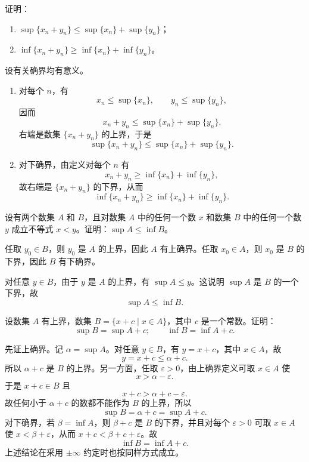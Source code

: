 \begin{xexercise}[5]
证明：
  \begin{enumerate}[label=(\arabic*)]
    \item $\sup\{x_n+y_n\}\leqslant\sup\{x_n\}+\sup\{y_n\}$；
    \item $\inf\{x_n+y_n\}\geqslant\inf\{x_n\}+\inf\{y_n\}$。
  \end{enumerate}
\end{xexercise}
\begin{xsolution}
设有关确界均有意义。
\begin{enumerate}[label=(\arabic*)]
  \item 对每个 $n$，有
  \[
    x_n\leqslant\sup\{x_n\},\qquad
    y_n\leqslant\sup\{y_n\},
  \]
  因而
  \[
    x_n+y_n\leqslant\sup\{x_n\}+\sup\{y_n\}.
  \]
  右端是数集 $\{x_n+y_n\}$ 的上界，于是
  \[
    \sup\{x_n+y_n\}\leqslant\sup\{x_n\}+\sup\{y_n\}.
  \]

  \item 对下确界，由定义对每个 $n$ 有
  \[
    x_n+y_n\geqslant\inf\{x_n\}+\inf\{y_n\},
  \]
  故右端是 $\{x_n+y_n\}$ 的下界，从而
  \[
    \inf\{x_n+y_n\}\geqslant\inf\{x_n\}+\inf\{y_n\}.
  \]
\end{enumerate}
\end{xsolution}


\begin{xexercise}[6]
设有两个数集 $A$ 和 $B$，且对数集 $A$ 中的任何一个数 $x$ 和数集 $B$ 中的任何一个数 $y$ 成立不等式 $x<y$。证明：$\sup A\leqslant\inf B$。
\end{xexercise}
\begin{xsolution}
任取 $y_0\in B$，则 $y_0$ 是 $A$ 的上界，因此 $A$ 有上确界。任取 $x_0\in A$，则 $x_0$ 是 $B$ 的下界，因此 $B$ 有下确界。

对任意 $y\in B$，由于 $y$ 是 $A$ 的上界，有 $\sup A\leqslant y$。这说明 $\sup A$ 是 $B$ 的一个下界，故
\[
  \sup A\leqslant\inf B.
\]
\end{xsolution}


\begin{xexercise}[7]
设数集 $A$ 有上界，数集 $B=\{x+c\mid x\in A\}$，其中 $c$ 是一个常数。证明：
  \[
    \sup B=\sup A+c;\qquad \inf B=\inf A+c.
  \]
\end{xexercise}
\begin{xsolution}
先证上确界。记 $\alpha=\sup A$。对任意 $y\in B$，有 $y=x+c$，其中 $x\in A$，故
\[
  y=x+c\leqslant\alpha+c.
\]
所以 $\alpha+c$ 是 $B$ 的上界。另一方面，任取 $\varepsilon>0$，由上确界定义可取 $x\in A$ 使
\[
  x>\alpha-\varepsilon.
\]
于是 $x+c\in B$ 且
\[
  x+c>\alpha+c-\varepsilon.
\]
故任何小于 $\alpha+c$ 的数都不能作为 $B$ 的上界，所以
\[
  \sup B=\alpha+c=\sup A+c.
\]
对下确界，若 $\beta=\inf A$，则 $\beta+c$ 是 $B$ 的下界，并且对每个 $\varepsilon>0$ 可取 $x\in A$ 使 $x<\beta+\varepsilon$，从而 $x+c<\beta+c+\varepsilon$。故
\[
  \inf B=\inf A+c.
\]
上述结论在采用 $\pm\infty$ 约定时也按同样方式成立。
\end{xsolution}


